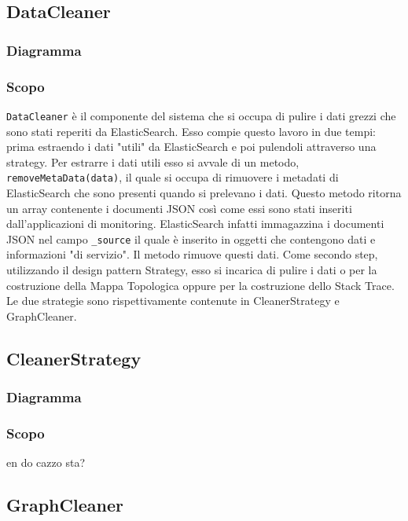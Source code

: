 \subsection{DataCleaner}
\label{sec:DataCleaner}
	\subsubsection{Diagramma}
	
	\subsubsection{Scopo}
	\texttt{DataCleaner} è il componente del sistema che si occupa di pulire i dati grezzi che sono stati reperiti da ElasticSearch. Esso compie questo lavoro in due tempi: prima estraendo i dati "utili" da ElasticSearch e poi pulendoli attraverso una strategy.
	Per estrarre i dati utili esso si avvale di un metodo, \texttt{removeMetaData(data)}, il quale si occupa di rimuovere i metadati di ElasticSearch che sono presenti quando si prelevano i dati. Questo metodo ritorna un array contenente i documenti JSON così come essi sono stati inseriti dall'applicazioni di monitoring. ElasticSearch infatti immagazzina i documenti JSON nel campo \texttt{\_source} il quale è inserito in oggetti che contengono dati e informazioni "di servizio". Il metodo rimuove questi dati.
	Come secondo step, utilizzando il design pattern Strategy, esso si incarica di pulire i dati o per la costruzione della Mappa Topologica oppure per la costruzione dello Stack Trace. Le due strategie sono rispettivamente contenute in CleanerStrategy e GraphCleaner.
	
\subsection{CleanerStrategy}
\label{sec:CleanerStrategy}
	\subsubsection{Diagramma}

	\subsubsection{Scopo}
	en do cazzo sta?
	
	
\subsection{GraphCleaner}
\label{sec:GraphCleaner}
